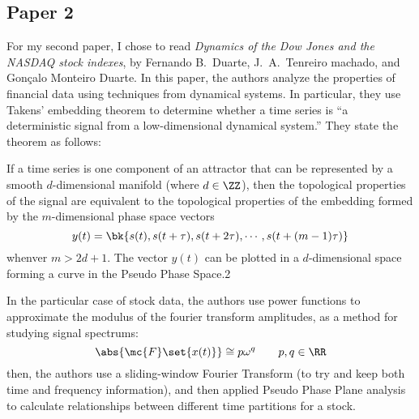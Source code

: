\documentclass[scipaper, 189]{pset}
\begin{document}
\begin{multicols}{2}
  \section{Paper 2}
  For my second paper, I chose to read \textit{Dynamics of the Dow
    Jones and the NASDAQ stock indexes}, by Fernando B.\ Duarte, J.\
  A.\ Tenreiro machado, and Gon\c{c}alo Monteiro Duarte. In this
  paper, the authors analyze the properties of financial data using
  techniques from dynamical systems. In particular, they use Takens'
  embedding theorem to determine whether a time series is ``a
  deterministic signal from a low-dimensional dynamical system.'' They
  state the theorem as follows:
  \begin{theorem}
    If a time series is one component of an attractor that can be
    represented by a smooth $d$-dimensional manifold (where $d \in
    \ZZ$), then the topological properties of the signal are
    equivalent to the topological properties of the embedding formed
    by the $m$-dimensional phase space vectors
    \[
      y(t) = \bk{s(t), s(t + \tau), s(t + 2\tau), \cdots, s(t +
        (m-1)\tau)}
    \]
    whenver $m > 2d + 1$. The vector $y(t)$ can be plotted in a
    $d$-dimensional space forming a curve in the Pseudo Phase Space.2
  \end{theorem}
  In the particular case of stock data, the authors use power
  functions to approximate the modulus of the fourier transform
  amplitudes, as a method for studying signal spectrums:
  \[
    \abs{\mc{F}\set{x(t)}} \cong p \omega^q \qquad p,q \in \RR
  \]
  then, the authors use a sliding-window Fourier Transform (to try and
  keep both time and frequency information), and then applied
  Pseudo Phase Plane analysis to calculate relationships between
  different time partitions for a stock.
\end{multicols}
\end{document}
